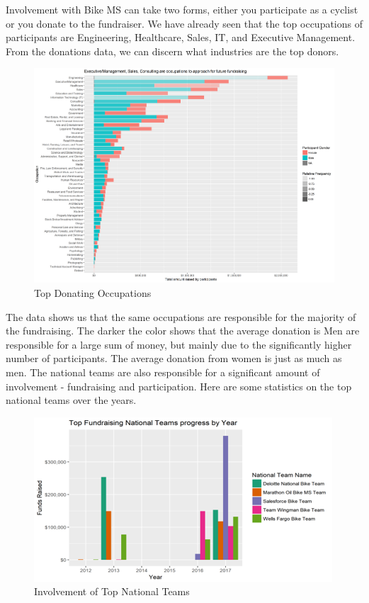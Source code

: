 \documentclass[]{article}
\begin{document}
Involvement with Bike MS can take two forms, either you participate as a
cyclist or you donate to the fundraiser. We have already seen that the
top occupations of participants are Engineering, Healthcare, Sales, IT,
and Executive Management. From the donations data, we can discern what
industries are the top donors.

\begin{figure}
\centering
\includegraphics{topOccupationsdonation.png}
\caption{Top Donating Occupations}
\end{figure}

The data shows us that the same occupations are responsible for the
majority of the fundraising. The darker the color shows that the average
donation is Men are responsible for a large sum of money, but mainly due
to the significantly higher number of participants. The average donation
from women is just as much as men. The national teams are also
responsible for a significant amount of involvement - fundraising and
participation. Here are some statistics on the top national teams over
the years.

\begin{figure}
\centering
\includegraphics{nationalteams1.png}
\caption{Involvement of Top National Teams}
\end{figure}
\end{document}
